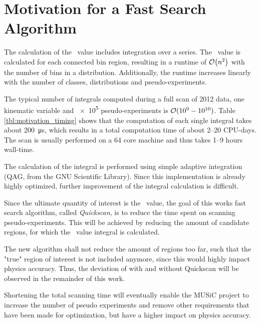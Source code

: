 
\chapter{Motivation for a Fast Search Algorithm}
\label{ch:quickkscan_motivation}

The calculation of the \p~value includes integration over a series. The \p~value is calculated for each connected bin region, resulting in a runtime of $\order{n^2}$ with the number of bins in a distribution. Additionally, the runtime increases linearly with the number of classes, distributions and pseudo-experiments.

The typical number of integrals computed during a full scan of 2012 data, one kinematic variable and \num{e5} pseudo-experiments is $\order{\numrange[range-phrase=-]{e9}{e10}}$. Table \ref{tbl:motivation_timing} shows that the computation of each single integral takes about \SI{200}{\micro\second}, which results in a total computation time of about \numrange{2}{20} CPU-days. The scan is usually performed on a \num{64} core machine and thus takes \numrange{1}{9} hours wall-time.

The calculation of the integral is performed using simple adaptive integration (QAG, from the GNU Scientific Library). Since this implementation is already highly optimized, further improvement of the integral calculation is difficult.

Since the ultimate quantity of interest is the \ptilde~value, the goal  of this works fast search algorithm, called \emph{Quickscan}, is to reduce the time spent on scanning pseudo-experiments. This will be achieved by reducing the amount of candidate regions, for which the \p~value integral is calculated. 

The new algorithm shall not reduce the amount of regions too far, such that the "true" region of interest is not included anymore, since this would highly impact physics accuracy. Thus, the deviation of \ptilde with and without Quickscan will be observed in the remainder of this work.

Shortening the total scanning time will eventually enable the MUSiC project to increase the number of pseudo experiments and remove other requirements that have been made for optimization, but have a higher impact on physics accuracy.

